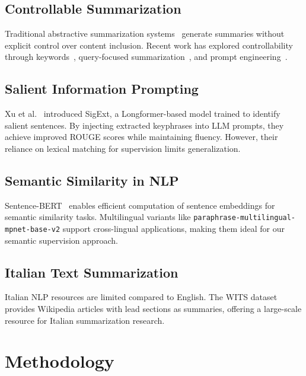 \documentclass[conference]{IEEEtran}
\begin{document}
\subsection{Controllable Summarization}
Traditional abstractive summarization systems~\cite{lewis2019bartdenoisingsequencetosequencepretraining, zhang2020pegasuspretrainingextractedgapsentences} generate summaries without explicit control over content inclusion. Recent work has explored controllability through keywords~\cite{he-etal-2022-ctrlsum}, query-focused summarization~\cite{xu-lapata-2020-coarse}, and prompt engineering~\cite{goyal2023newssummarizationevaluationera}.

\subsection{Salient Information Prompting}
Xu et al.~\cite{xu2024salientinformationpromptingsteer} introduced SigExt, a Longformer-based model trained to identify salient sentences. By injecting extracted keyphrases into LLM prompts, they achieve improved ROUGE scores while maintaining fluency. However, their reliance on lexical matching for supervision limits generalization.

\subsection{Semantic Similarity in NLP}
Sentence-BERT~\cite{reimers2019sentencebertsentenceembeddingsusing} enables efficient computation of sentence embeddings for semantic similarity tasks. Multilingual variants like \texttt{paraphrase-multilingual-mpnet-base-v2} support cross-lingual applications, making them ideal for our semantic supervision approach.

\subsection{Italian Text Summarization}
Italian NLP resources are limited compared to English. The WITS dataset~\cite{casola-lavelli-2021-wits} provides Wikipedia articles with lead sections as summaries, offering a large-scale resource for Italian summarization research.

\section{Methodology}
\end{document}
